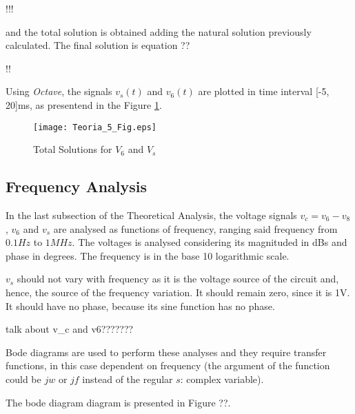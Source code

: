 !!!

and the total solution is obtained adding the natural solution previously calculated. The final solution is equation ??

!!

Using \textit{Octave}, the signals $v_s(t)$ and $v_6(t)$ are plotted in time interval [-5, 20]ms, as presentend in the Figure \ref{plot5}.


\begin{figure}[!ht]
\centering
\texttt{[image: Teoria\_5\_Fig.eps]}
\caption{Total Solutions for $V_6$ and $V_s$}
\label{plot5}
\end{figure}

\subsection{Frequency Analysis}
\label{subsec:freq_theory}

In the last subsection of the Theoretical Analysis, the voltage signals $v_c = v_6 - v_8$, $v_6$ and $v_s$ are analysed as functions of frequency, ranging said frequency from $0.1 Hz$ to $1 MHz$. The voltages is analysed considering its magnituded in dBs and phase in degrees. The frequency is in the base 10 logarithmic scale. 

$v_s$ should not vary with frequency as it is the voltage source of the circuit and, hence, the source of the frequency variation. It should remain zero, since it is 1V. It should have no phase, because its sine function has no phase.

talk about v_c and v6???????

Bode diagrams are used to perform these analyses and they require transfer functions, in this case dependent on frequency (the argument of the function could be $jw$ or $jf$ instead of the regular $s$: complex variable).

The bode diagram diagram is presented in Figure ??.








